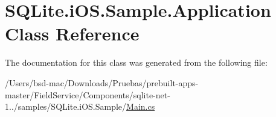 \hypertarget{class_s_q_lite_1_1i_o_s_1_1_sample_1_1_application}{\section{S\+Q\+Lite.\+i\+O\+S.\+Sample.\+Application Class Reference}
\label{class_s_q_lite_1_1i_o_s_1_1_sample_1_1_application}
}


The documentation for this class was generated from the following file\+:\begin{DoxyCompactItemize}
\item 
/\+Users/bsd-\/mac/\+Downloads/\+Pruebas/prebuilt-\/apps-\/master/\+Field\+Service/\+Components/sqlite-\/net-\/1../samples/\+S\+Q\+Lite.\+i\+O\+S.\+Sample/\hyperlink{_components_2sqlite-net-1_80_81_2samples_2_s_q_lite_8i_o_s_8_sample_2_main_8cs}{Main.\+cs}\end{DoxyCompactItemize}
